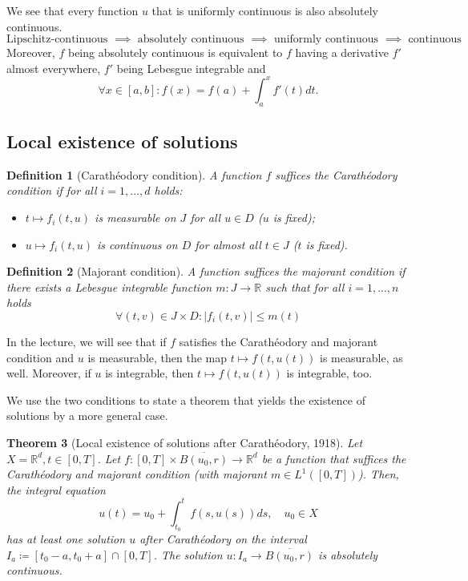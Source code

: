 \documentclass[a4paper, 11pt]{article}
\newtheorem{theorem}{Theorem}
\newtheorem{definition}[theorem]{Definition}
\begin{document}
We see that every function $u$ that is uniformly continuous is also absolutely continuous.
\[
\text{Lipschitz-continuous $\implies$ absolutely continuous $\implies$ uniformly continuous $\implies$ continuous}.
\]
Moreover, $f$ being absolutely continuous is equivalent to $f$ having a derivative $f'$ almost everywhere, $f'$ being Lebesgue integrable and
\[
\forall x \in [a,b]: f(x) = f(a) +  \int^x_a f'(t) dt.
\]



\subsection*{Local existence of solutions}
\begin{definition}[Carathéodory condition]
	A function $f$ suffices the \emph{Carathéodory condition} if for all $i=1,...,d$ holds:
	\begin{itemize}
		\item $t \mapsto f_i(t,u)$ is measurable on $J$ for all $u \in D$ ($u$ is fixed);
		\item $u \mapsto f_i(t,u)$ is continuous on $D$ for almost all $t \in J$ ($t$ is fixed).
	\end{itemize}
\end{definition}

\begin{definition}[Majorant condition]\label{majorant}
	A function suffices the \emph{majorant condition} if there exists a Lebesgue integrable function $m: J \to \mathbb R$ such that for all $i=1,...,n$ holds
	\[
	\forall (t,v) \in J \times D: |f_i(t,v)| \leq m(t)
	\]
\end{definition}

In the lecture, we will see that if $f$ satisfies the Carathéodory and majorant condition and $u$ is measurable, then the map $t \mapsto f(t,u(t))$ is measurable, as well. Moreover, if $u$ is integrable, then $t \mapsto f(t,u(t))$ is integrable, too.

We use the two conditions to state a theorem that yields the existence of solutions by a more general case.

\begin{theorem}[Local existence of solutions after Carathéodory, 1918]
	Let $X = \mathbb R^d, t \in [0,T]$. Let $f: [0,T] \times \overline{B(u_0,r)} \to \mathbb R^d$ be a function that suffices the Carathéodory and majorant condition (with majorant $m \in L^1([0,T])$). Then, the integral equation 
	\[
	u(t) = u_0 + \int^t_{t_0}f(s,u(s)) ds, \quad u_0 \in X
	\] 
	has at least one solution $u$ after Carathéodory on the interval $I_a \coloneqq [t_0-a,t_0+a] \cap [0,T]$. The solution $u: I_a \to \overline{B(u_0,r)}$ is absolutely continuous. 
\end{theorem}
\end{document}
